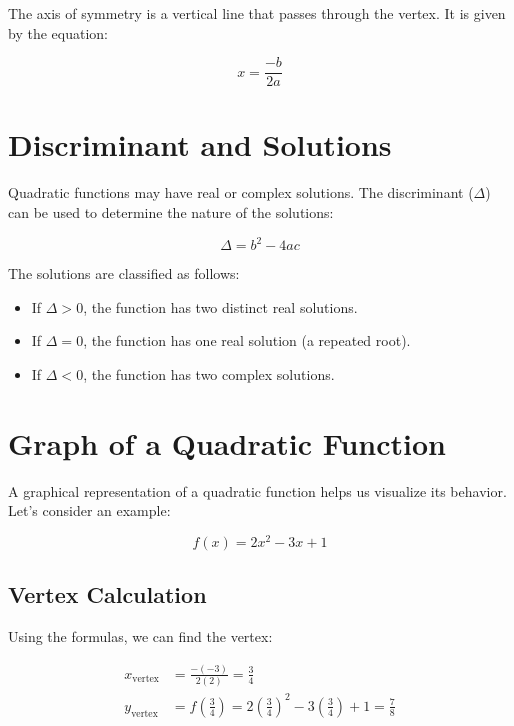 \documentclass[12pt,a4paper]{article}
\begin{document}
The axis of symmetry is a vertical line that passes through the vertex. It is given by the equation:

\begin{equation}
x = \frac{-b}{2a}
\end{equation}

\section{Discriminant and Solutions}

Quadratic functions may have real or complex solutions. The discriminant ($\Delta$) can be used to determine the nature of the solutions:

\begin{equation}
\Delta = b^2 - 4ac
\end{equation}

The solutions are classified as follows:

\begin{itemize}
    \item If $\Delta > 0$, the function has two distinct real solutions.
    \item If $\Delta = 0$, the function has one real solution (a repeated root).
    \item If $\Delta < 0$, the function has two complex solutions.
\end{itemize}
\section{Graph of a Quadratic Function}

A graphical representation of a quadratic function helps us visualize its behavior. Let's consider an example:

\begin{equation}
f(x) = 2x^2 - 3x + 1
\end{equation}

\subsection{Vertex Calculation}

Using the formulas, we can find the vertex:

\begin{align*}
x_{\text{vertex}} &= \frac{-(-3)}{2(2)} = \frac{3}{4} \\
y_{\text{vertex}} &= f\left(\frac{3}{4}\right) = 2\left(\frac{3}{4}\right)^2 - 3\left(\frac{3}{4}\right) + 1 = \frac{7}{8}
\end{align*}
\end{document}
